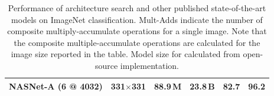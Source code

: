 \begin{table}[h!]
\begin{tabular}{lc|cc|cc}
\textbf{NASNet-A (6 @ 4032)} & \textbf{331$\times$331} & \textbf{88.9\,M} & \textbf{23.8\,B} & \textbf{82.7} & \textbf{96.2} \\
\bottomrule
\end{tabular}

\vspace{0.2cm}
\caption{Performance of architecture search and other published state-of-the-art models on ImageNet classification. Mult-Adds indicate the number of composite multiply-accumulate operations for a single image. Note that the composite multiple-accumulate operations are calculated for the image size reported in the table. Model size for \cite{hu2017squeeze} calculated from open-source implementation.}
\label{tab:imagenet}
\end{table}

